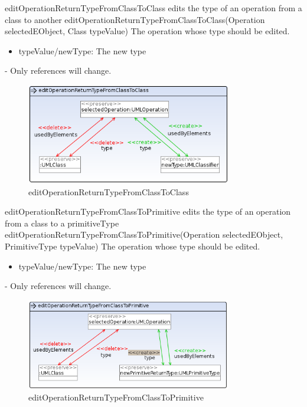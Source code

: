 \op
{editOperationReturnTypeFromClassToClass}
{edits the type of an operation from a class to another}
{editOperationReturnTypeFromClassToClass(Operation selectedEObject, Class typeValue)}
{The operation whose type should be edited.}
{
\begin{itemize}
 \item typeValue/newType: The new type
\end{itemize}
}
{-}
{Only references will change.}
\begin{figure}[H]
  \centering
  \includegraphics[width=0.8\textwidth]{pics/editOperationReturnTypeFromClassToClass.png}
  \caption{editOperationReturnTypeFromClassToClass}
  \label{editOperationReturnTypeFromClassToClass}
\end{figure}
\op
{editOperationReturnTypeFromClassToPrimitive}
{edits the type of an operation from a class to a primitiveType}
{editOperationReturnTypeFromClassToPrimitive(Operation selectedEObject, PrimitiveType typeValue)}
{The operation whose type should be edited.}
{
\begin{itemize}
 \item typeValue/newType: The new type
\end{itemize}
}
{-}
{Only references will change.}
\begin{figure}[H]
  \centering
  \includegraphics[width=0.8\textwidth]{pics/editOperationReturnTypeFromClassToPrimitive.png}
  \caption{editOperationReturnTypeFromClassToPrimitive}
  \label{editOperationReturnTypeFromClassToPrimitive}
\end{figure}
